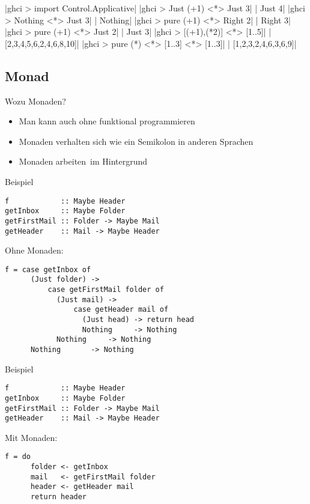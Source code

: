 \documentclass{beamer}
\begin{document}
\begin{frame}[fragile]
|ghci > import Control.Applicative|
|ghci > Just (+1) <*> Just 3|
\pause
{}|       Just 4|
|ghci > Nothing <*> Just 3|
\pause
{}|       Nothing|
|ghci > pure (+1) <*> Right 2|
\pause
{}|       Right 3|
|ghci > pure (+1) <*> Just 2|
\pause
{}|       Just 3|
|ghci > [(+1),(*2)] <*> [1..5]|
\pause
{}|       [2,3,4,5,6,2,4,6,8,10]|
|ghci > pure (*) <*> [1..3] <*> [1..3]|
\pause
{}|       [1,2,3,2,4,6,3,6,9]|
\end{frame}


\subsection{Monad}
\begin{frame}
Wozu Monaden?
\pause
\begin{itemize}
 \item Man kann auch ohne funktional programmieren
 \pause
 \item Monaden verhalten sich wie ein Semikolon in anderen Sprachen
 \pause
 \item Monaden \glqq arbeiten\grqq \ im Hintergrund
\end{itemize}

\end{frame}

\begin{frame}[fragile]
Beispiel
\begin{verbatim}
f            :: Maybe Header
getInbox     :: Maybe Folder
getFirstMail :: Folder -> Maybe Mail
getHeader    :: Mail -> Maybe Header
\end{verbatim}
\pause
Ohne Monaden:
\begin{verbatim}
f = case getInbox of
      (Just folder) -> 
          case getFirstMail folder of
            (Just mail) -> 
                case getHeader mail of
                  (Just head) -> return head
                  Nothing     -> Nothing
            Nothing     -> Nothing
      Nothing       -> Nothing
\end{verbatim}
\end{frame}
\begin{frame}[fragile]
Beispiel
\begin{verbatim}
f            :: Maybe Header
getInbox     :: Maybe Folder
getFirstMail :: Folder -> Maybe Mail
getHeader    :: Mail -> Maybe Header
\end{verbatim}
Mit Monaden:
\begin{verbatim}
f = do
      folder <- getInbox
      mail   <- getFirstMail folder
      header <- getHeader mail
      return header
\end{verbatim}

\end{frame}
\end{document}
